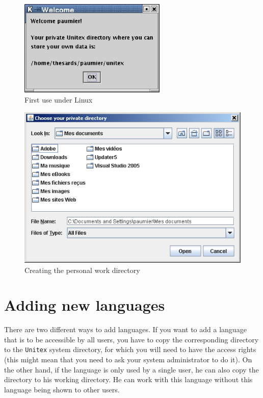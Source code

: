 \begin{figure}[h]
\begin{center}
\includegraphics[width=7cm]{resources/img/fig1-2.png}
\caption{First use under Linux}
\end{center}
\end{figure}

\begin{figure}[h]
\begin{center}
\includegraphics[width=13cm]{resources/img/fig1-3.png}
\caption{Creating the personal work
directory\label{fig-creation-personal-directory}}
\end{center}
\end{figure}



\section{Adding new languages}

\bigskip
\noindent There are two different ways to add languages. If you want to add 
a language that is to be accessible by all  users, you have to copy the 
corresponding directory to the \verb+Unitex+ system directory, for which 
you will need to have the access rights  (this might mean that you need to 
ask your system administrator to do it). On the other hand, if the language 
is only used by a single user, he can also copy the directory to his working 
directory. He can work with this language without this language being shown to other users.


